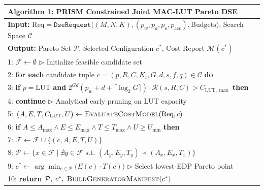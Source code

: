 \documentclass[10pt,letterpaper,twocolumn]{article}
\begin{document}
\begin{table}[t]
  \centering
  \footnotesize
  \setlength{\tabcolsep}{3.0pt}
  \begin{tabularx}{\columnwidth}{X}
    \toprule
    \textbf{Algorithm 1:} PRISM Constrained Joint MAC-LUT Pareto DSE \\
    \midrule
    \textbf{Input:} $\text{Req} = \texttt{DseRequest}\big((M,N,K), (p_w,p_a,p_o,p_{\text{acc}}), \text{Budgets}\big)$, Search Space $\mathcal{C}$ \\
    \textbf{Output:} Pareto Set $\mathcal{P}$, Selected Configuration $c^*$, Cost Report $\mathcal{M}(c^*)$ \\
    1: $\mathcal{F} \leftarrow \emptyset$ \hfill $\triangleright$ Initialize feasible candidate set \\
    2: \textbf{for each} candidate tuple $c = (p, R, C, K_t, G, d, s, f, q) \in \mathcal{C}$ \textbf{do} \\
    3: \hspace{0.8em} \textbf{if} $p = \text{LUT}$ \textbf{and} $2^{Gd}(p_w+d+\lceil\log_2 G\rceil) \cdot \mathcal{R}(s,R,C) > C_{\text{LUT},\max}$ \textbf{then} \\
    4: \hspace{1.6em} \textbf{continue} \hfill $\triangleright$ Analytical early pruning on LUT capacity \\
    5: \hspace{0.8em} $\big(A, E, T, C_{\text{LUT}}, U\big) \leftarrow \textsc{EvaluateCostModel}(\text{Req}, c)$ \\
    6: \hspace{0.8em} \textbf{if} $A \le A_{\max} \land E \le E_{\max} \land T \le T_{\max} \land U \ge U_{\min}$ \textbf{then} \\
    7: \hspace{1.6em} $\mathcal{F} \leftarrow \mathcal{F} \cup \{(c, A, E, T, U)\}$ \\
    8: $\mathcal{P} \leftarrow \big\{ x \in \mathcal{F} \;\big|\; \nexists y \in \mathcal{F} \text{ s.t. } (A_y, E_y, T_y) \prec (A_x, E_x, T_x) \big\}$ \\
    9: $c^* \leftarrow \arg\min_{c \in \mathcal{P}} \big( E(c) \cdot T(c) \big)$ \hfill $\triangleright$ Select lowest-EDP Pareto point \\
    10: \textbf{return} $\mathcal{P},\; c^*,\; \textsc{BuildGeneratorManifest}(c^*)$ \\
    \bottomrule
  \end{tabularx}
\end{table}
\end{document}
